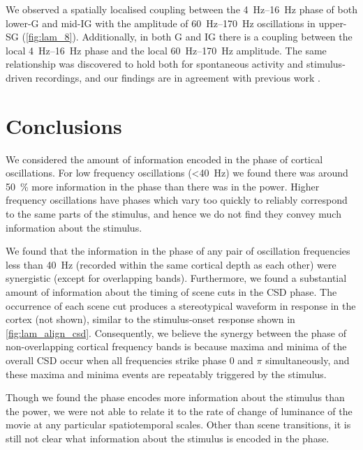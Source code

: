 We observed a spatially localised coupling between the \SIrange{4}{16}{Hz} phase of both lower-\ac{G} and mid-\ac{IG} with the amplitude of \SIrange{60}{170}{Hz} oscillations in upper-\ac{SG} (\autoref{fig:lam_8}).
Additionally, in both \ac{G} and \ac{IG} there is a coupling between the local \SIrange{4}{16}{Hz} phase and the local \SIrange{60}{170}{Hz} amplitude.
The same relationship was discovered to hold both for spontaneous activity and stimulus-driven recordings, and our findings are in agreement with previous work \citep{Spaak2012}.


\section{Conclusions}

We considered the amount of information encoded in the phase of cortical oscillations.
For low frequency oscillations (\SI{<40}{Hz}) we found there was around \SI{50}{\percent} more information in the phase than there was in the power.
Higher frequency oscillations have phases which vary too quickly to reliably correspond to the same parts of the stimulus, and hence we do not find they convey much information about the stimulus.

We found that the information in the phase of any pair of oscillation frequencies less than \SI{40}{Hz} (recorded within the same cortical depth as each other) were synergistic (except for overlapping bands).
Furthermore, we found a substantial amount of information about the timing of scene cuts in the \ac{CSD} phase.
The occurrence of each scene cut produces a stereotypical waveform in response in the cortex (not shown), similar to the stimulus-onset response shown in \autoref{fig:lam_align_csd}.
Consequently, we believe the synergy between the phase of non-overlapping cortical frequency bands is because maxima and minima of the overall \ac{CSD} occur when all frequencies strike phase $0$ and $\pi$ simultaneously, and these maxima and minima events are repeatably triggered by the stimulus.

Though we found the phase encodes more information about the stimulus than the power, we were not able to relate it to the rate of change of luminance of the movie at any particular spatiotemporal scales.
Other than scene transitions, it is still not clear what information about the stimulus is encoded in the phase.

